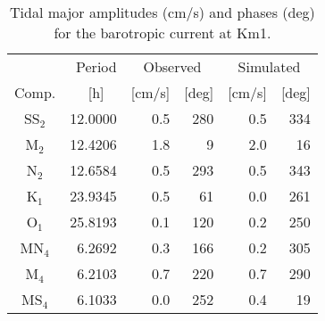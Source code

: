 \begin{table}[ht]
	\caption{\small Tidal major amplitudes (cm/s) and phases (deg) for the barotropic current at Km1.}
	\label{tab:UbarTide}
	\centering
	\begin{tabular}{crrrrr} \hline
       		& \small Period     	& \multicolumn{2}{c}{\small Observed}	& \multicolumn{2}{c}{\small Simulated}  \\
\small Comp.	& \small [h] $\;\;$ 	& \small [cm/s] 	& \small [deg]	& \small [cm/s] & \small [deg]		\\ \hline 
\small SS$_2$  	& \small 12.0000    	&  \small 0.5 		& \small 280	& \small 0.5 	& \small 334   		\\
\small M$_2$  	& \small 12.4206    	&  \small 1.8 		& \small   9	& \small 2.0 	& \small  16   		\\
\small N$_2$  	& \small 12.6584    	&  \small 0.5 		& \small 293	& \small 0.5 	& \small 343   		\\
\small K$_1$  	& \small 23.9345    	&  \small 0.5 		& \small  61	& \small 0.0 	& \small 261   		\\
\small O$_1$  	& \small 25.8193    	&  \small 0.1 		& \small 120	& \small 0.2 	& \small 250   		\\
\small MN$_4$ 	& \small  6.2692    	&  \small 0.3 		& \small 166	& \small 0.2 	& \small 305   		\\
\small M$_4$  	& \small  6.2103    	&  \small 0.7 		& \small 220	& \small 0.7 	& \small 290   		\\
\small MS$_4$ 	& \small  6.1033    	&  \small 0.0 		& \small 252	& \small 0.4 	& \small  19   		\\ \hline 
	\end{tabular}
\end{table}

